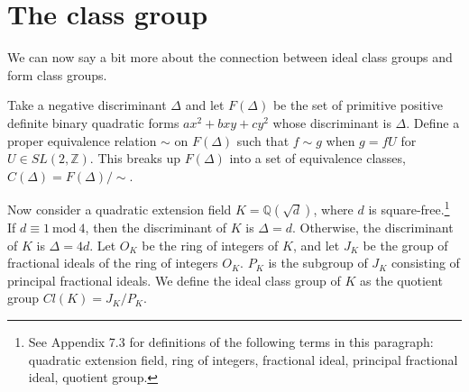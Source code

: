 \documentclass{article}
\theoremstyle{definition}
\theoremstyle{theorem}
\theoremstyle{example}
\theoremstyle{corollary}
\begin{document}
\bigskip








\section{The class group}

\bigskip

We can now say a bit more about the connection between ideal class groups and form class groups.

\bigskip

Take a negative discriminant \(\Delta\) and let \(F ( \Delta)\) be the set of primitive positive definite binary quadratic forms \(ax^{2} + b xy + c y^{2}\) whose discriminant is \(\Delta\). Define a proper equivalence relation \(\sim \) on \(F (\Delta)\) such that \(f \sim g\) when \(g = fU\) for \(U \in SL(2, \mathbb{Z})\). This breaks up \(F (\Delta)\) into a set of equivalence classes, \(C(\Delta) = F(\Delta) / \sim\).

\bigskip

Now consider a quadratic extension field \(K = \mathbb{Q}(\sqrt{d})\), where \(d\) is square-free.\footnote{See Appendix 7.3 for definitions of the following terms in this paragraph: quadratic extension field, ring of integers, fractional ideal, principal fractional ideal, quotient group.} If \(d \equiv 1 \ \textrm{mod} \ 4\), then the discriminant of \(K\) is \(\Delta = d\). Otherwise, the discriminant of \(K\) is \(\Delta = 4d\). Let \(O_{K}\) be the ring of integers of \(K\), and let \(J_{K}\) be the group of fractional ideals of the ring of integers \(O_{K}\). \(P_{K}\) is the subgroup of \(J_{K}\) consisting of principal fractional ideals. We define the ideal class group of \(K\) as the quotient group \(Cl(K) = J_{K} / P_{K}\). %

\bigskip
\end{document}
